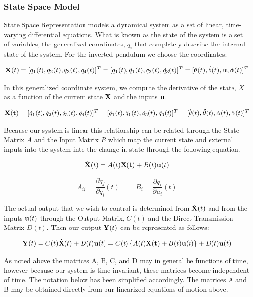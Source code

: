 \documentclass{article}
\theoremstyle{plain}
\theoremstyle{definition}
\theoremstyle{remark}
\begin{document}
\subsubsection*{State Space Model}

State Space Representation models a dynamical system as a set of linear, time-varying differential equations.  What is known as the state of the system is a set of variables, the generalized coordinates, $q_i$ that completely describe the internal state of the system.  For the inverted pendulum we choose the coordinates: 

$$ {\bf{X}}(t) = [q_1(t), q_2(t), q_3(t), q_4(t)]^T = [q_1(t), \dot{q}_1(t), q_3(t), \dot{q}_3(t)]^T = [\theta(t), \dot{\theta}(t), \alpha, \dot{\alpha}(t)]^T $$

In this generalized coordinate system, we compute the derivative of the state, $\dot{X}$ as a function of the current state $\bf{X}$ and the inputs $\bf{u}$. 

$$ \dot{\bf{X}(t)} = [\dot{q}_1(t), \dot{q}_2(t), \dot{q}_3(t), \dot{q}_4(t)]^T = [\dot{q}_1(t), \ddot{q}_1(t), \dot{q}_3(t), \ddot{q}_3(t)]^T = [\dot{\theta}(t), \ddot{\theta}(t), \dot{\alpha}(t), \ddot{\alpha}(t)]^T $$

Because our system is linear this relationship can be related through the State Matrix $A$ and the Input Matrix $B$ which map the current state and external inputs into the system into the change in state through the following equation.

$$ \dot{\bf{X}}(t) = A(t) {\bf{X}(t)} + B(t) {\bf{u}}(t)$$

$$ A_{ij} = \frac{\partial \dot{q}_j}{\partial q_i}(t) \hspace{1cm}  B_{i} = \frac{\partial \dot{q}_i}{\partial u_i}(t)$$

The actual output that we wish to control is determined from $\dot{\bf{X}}(t)$ and from the inputs ${\bf{u}}(t)$ through the Output Matrix, $C(t)$ and the Direct Transmission Matrix $D(t)$.  Then our output ${\bf{Y}}(t)$ can be represented as follows:

$$ {\bf{Y}}(t) = C(t) \dot{\bf{X}}(t) + D(t) {\bf{u}}(t) = C(t) \left\{ A(t) {\bf{X}(t)} + B(t) {\bf{u}}(t) \right\}+ D(t) {\bf{u}}(t)$$

As noted above the matrices A, B, C, and D may in general be functions of time, however because our system is time invariant, these matrices become independent of time.  The notation below has been simplified accordingly.  The matrices A and B may be obtained directly from our linearized equations of motion above.  
\end{document}
